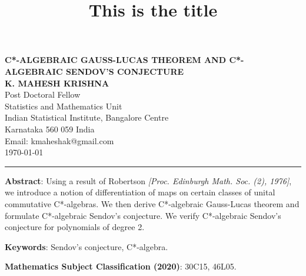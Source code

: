 \documentclass{amsart}
\title{This is the title}
\begin{document}
	\begin{center}
	{\bf{C*-ALGEBRAIC GAUSS-LUCAS THEOREM AND C*-ALGEBRAIC SENDOV'S CONJECTURE}}\\
	{\bf{K. MAHESH KRISHNA}}\\
	Post Doctoral Fellow\\
	Statistics and Mathematics Unit\\
	Indian Statistical Institute, Bangalore Centre\\
	Karnataka 560 059 India\\
	Email: kmaheshak@gmail.com \\
	\today
\end{center}

\hrule
\vspace{0.5cm}


\textbf{Abstract}:  Using a result of Robertson \textit{[Proc. Edinburgh Math. Soc. (2), 1976]}, we introduce a  notion of differentiation of maps on certain classes of unital commutative  C*-algebras. We then derive C*-algebraic Gauss-Lucas theorem and formulate C*-algebraic Sendov's conjecture. We verify C*-algebraic Sendov's conjecture for polynomials of degree 2.  

\textbf{Keywords}: Sendov's conjecture, C*-algebra.

\textbf{Mathematics Subject Classification (2020)}: 30C15, 46L05.
\tableofcontents
\end{document}
